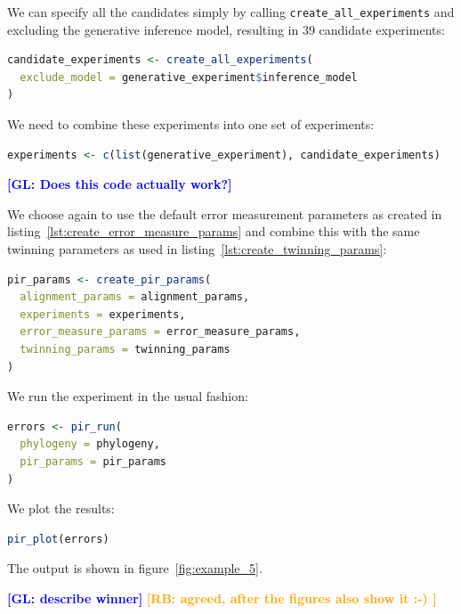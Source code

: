 \documentclass{article}
\newcommand{\giovanni}[1]{\textcolor{blue}{\textbf{[GL: #1]}}}
\newcommand{\richel}[1]{\textcolor{orange}{\textbf{[RB: #1]}}}
\begin{document}
We can specify all the candidates simply by calling 
\verb;create_all_experiments; and excluding the generative inference model,
resulting in 39 candidate experiments:

\begin{lstlisting}[language=R, floatplacement=H, frame=single]
candidate_experiments <- create_all_experiments(
  exclude_model = generative_experiment$inference_model
)
\end{lstlisting}

We need to combine these experiments into one set of experiments:

\begin{lstlisting}[language=R, floatplacement=H, frame=single]
experiments <- c(list(generative_experiment), candidate_experiments)
\end{lstlisting}
\giovanni{Does this code actually work?}

We choose again to use the default error measurement parameters
as created in listing~\ref{lst:create_error_measure_params}
and combine this with the same twinning parameters 
as used in listing~\ref{lst:create_twinning_params}:

\begin{lstlisting}[language=R, floatplacement=H, frame=single]
pir_params <- create_pir_params(
  alignment_params = alignment_params,
  experiments = experiments,
  error_measure_params = error_measure_params,
  twinning_params = twinning_params
)
\end{lstlisting}

We run the experiment in the usual fashion:

\begin{lstlisting}[language=R, floatplacement=H, frame=single]
errors <- pir_run(
  phylogeny = phylogeny,
  pir_params = pir_params
)
\end{lstlisting}

We plot the results:

\begin{lstlisting}[language=R, floatplacement=H, frame=single]
pir_plot(errors)
\end{lstlisting}

The output is shown in figure~\ref{fig:example_5}.

\giovanni{describe winner}
\richel{agreed, after the figures also show it :-) }
\end{document}

